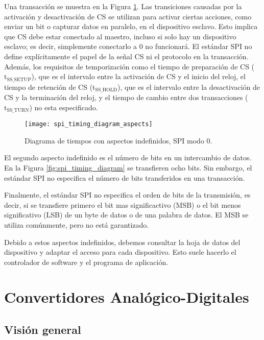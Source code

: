     Una transacción se muestra en la Figura \ref{fig:spi_timing_diagram_aspects}. Las transiciones causadas por la activación y desactivación de CS se utilizan para activar ciertas acciones, como enviar un bit o capturar datos en paralelo, en el dispositivo esclavo. Esto implica que CS debe estar conectado al maestro, incluso si solo hay un dispositivo esclavo; es decir, simplemente conectarlo a 0 no funcionará. El estándar SPI no define explícitamente el papel de la señal CS ni el protocolo en la transacción. Además, los requisitos de temporización como el tiempo de preparación de CS ($\text{t}_{\text{SS\_SETUP}}$), que es el intervalo entre la activación de CS y el inicio del reloj, el tiempo de retención de CS ($\text{t}_{\text{SS\_HOLD}}$), que es el intervalo entre la desactivación de CS y la terminación del reloj, y el tiempo de cambio entre dos transacciones ($\text{t}_{\text{SS\_TURN}}$) no esta especificado.

    \begin{figure}[!h]
      \centering
      \texttt{[image: spi\_timing\_diagram\_aspects]}
      \caption{Diagrama de tiempos con aspectos indefinidos, SPI modo 0.}
      \label{fig:spi_timing_diagram_aspects}
    \end{figure}

    El segundo aspecto indefinido es el número de bits en un intercambio de datos. En la Figura \ref{fig:spi_timing_diagram} se transfieren ocho bits. Sin embargo, el estándar SPI no especifica el número de bits transferidos en una transacción.

    Finalmente, el estándar SPI no especifica el orden de bits de la transmisión, es decir, si se transfiere primero el bit mas significactivo (MSB) o el bit menos significativo (LSB) de un byte de datos o de una palabra de datos. El MSB se utiliza comúnmente, pero no está garantizado.

    Debido a estos aspectos indefinidos, debemos consultar la hoja de datos del dispositivo y adaptar el acceso para cada dispositivo. Esto suele hacerlo el controlador de software y el programa de aplicación.


  \section{Convertidores Analógico-Digitales}

    \subsection{Visión general}

